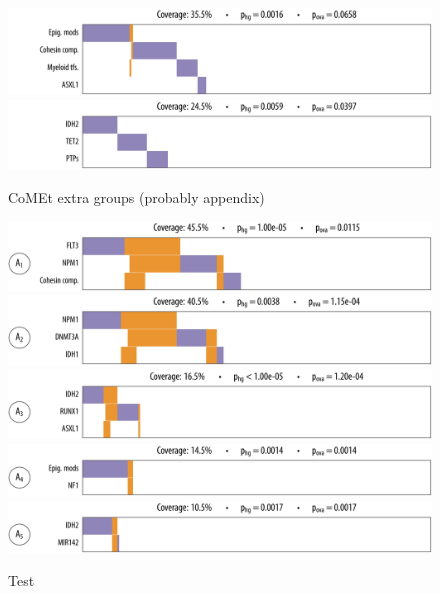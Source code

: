 \begin{figure}[htbp]
\centering
\includegraphics[width=\textwidth]{figures/genes/aml_comet1.pdf}\\[2em]
\includegraphics[width=\textwidth]{figures/genes/aml_comet2.pdf}\\[2em]
\caption{CoMEt extra groups (probably appendix)}
\end{figure}

\begin{figure}[htbp]
\centering
\includegraphics[width=\textwidth]{figures/genes/aml_2_a.pdf}\\[2em]
\includegraphics[width=\textwidth]{figures/genes/aml_1_a.pdf}\\[2em]
\includegraphics[width=\textwidth]{figures/genes/aml_3_a.pdf}\\[2em]
\includegraphics[width=\textwidth]{figures/genes/aml_5_a.pdf}\\[2em]
\includegraphics[width=\textwidth]{figures/genes/aml_4_a.pdf}\\[2em]
\caption{Test}
\end{figure}

